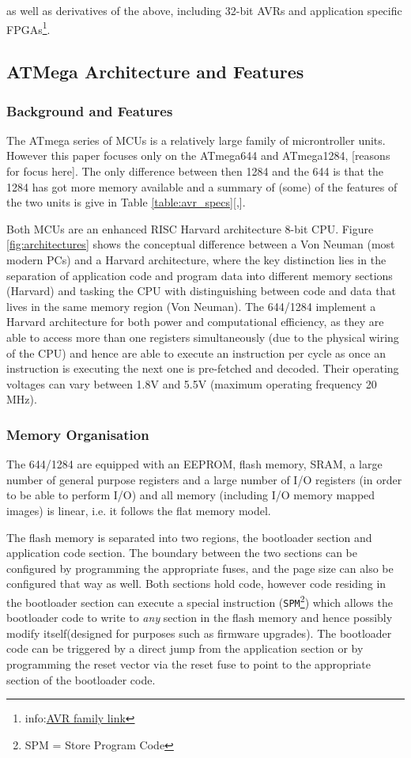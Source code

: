 \documentclass[12pt,a4paper,twocolumn]{article}
\begin{document}
as well as derivatives of the above, including 32-bit AVRs and application specific FPGAs\footnote{info:\href{http://www.atmel.com/products/microcontrollers/avr/default.aspx}{AVR family link}}.

	\subsection{ATMega Architecture and Features}				

	\subsubsection{Background and Features}
	The ATmega series of MCUs is a relatively large family of microntroller units. However this paper focuses only on the ATmega644 and ATmega1284, [reasons for focus here]. The only difference between then 1284 and the 644 is that the 1284 has got more memory available and a summary of (some) of the features of the two units is give in Table \ref{table:avr_specs}[\citep{atmega644_manual},\citep{atmega1284_manual}]. 
	
	Both MCUs are an enhanced RISC Harvard architecture 8-bit CPU. Figure \ref{fig:architectures} shows the conceptual difference between a Von Neuman (most modern PCs) and a Harvard architecture, where the key distinction lies in the separation of application code and program data into different memory sections (Harvard) and tasking the CPU with distinguishing between code and data that lives in the same memory region (Von Neuman). The 644/1284 implement a Harvard architecture for both power and computational efficiency, as they are able to access more than one registers simultaneously (due to the physical wiring of the CPU) and hence are able to execute an instruction per cycle as once an instruction is executing the next one is pre-fetched and decoded. Their operating voltages can vary between 1.8V and 5.5V (maximum operating frequency 20 MHz).
	
	\subsubsection{Memory Organisation}
	The 644/1284 are equipped with an EEPROM, flash memory, SRAM, a large number of general purpose registers and a large number of I/O registers (in order to be able to perform I/O) and all memory (including I/O memory mapped images) is linear, i.e. it follows the flat memory model.
	
	The flash memory is separated into two regions, the bootloader section and application code section. The boundary between the two sections can be configured by programming the appropriate fuses, and the page size can also be configured that way as well. Both sections hold code, however code residing in the bootloader section can execute a special instruction (\texttt{SPM}\footnote{SPM = Store Program Code}) which allows the bootloader code to write to \textit{any} section in the flash memory and hence possibly modify itself(designed for purposes such as firmware upgrades). The bootloader code can be triggered by a direct jump from the application section or by programming the reset vector via the reset fuse to point to the appropriate section of the bootloader code. 
	
\end{document}
